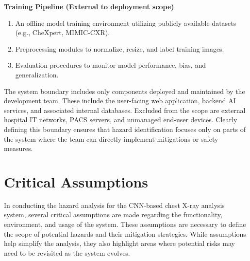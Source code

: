 \documentclass{article}
\begin{document}
\textbf{Training Pipeline (External to deployment scope)}
\begin{enumerate}
  \item An offline model training environment utilizing publicly available datasets (e.g., CheXpert, MIMIC-CXR).
  \item Preprocessing modules to normalize, resize, and label training images.
  \item Evaluation procedures to monitor model performance, bias, and generalization.
\end{enumerate}

The system boundary includes only components deployed and maintained by the development team. These include the user-facing web application, backend AI services, and associated internal databases. Excluded from the scope are external hospital IT networks, PACS servers, and unmanaged end-user devices. Clearly defining this boundary ensures that hazard identification focuses only on parts of the system where the team can directly implement mitigations or safety measures.

\section{Critical Assumptions}


In conducting the hazard analysis for the CNN-based chest X-ray analysis system, several critical assumptions are made regarding the functionality, environment, and usage of the system. These assumptions are necessary to define the scope of potential hazards and their mitigation strategies. While assumptions help simplify the analysis, they also highlight areas where potential risks may need to be revisited as the system evolves.
\end{document}
